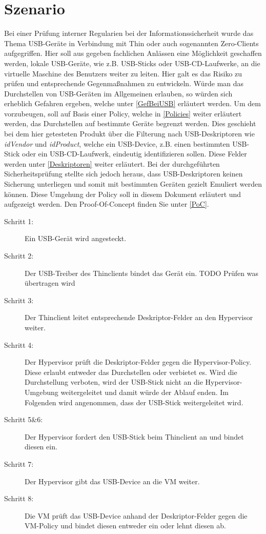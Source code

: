 \chapter{Szenario}
Bei einer Prüfung interner Regularien bei der Informationssicherheit wurde das Thema USB-Geräte in Verbindung mit Thin oder auch sogenannten Zero-Clients aufgegriffen. Hier soll aus gegeben fachlichen Anlässen eine Möglichkeit geschaffen werden, lokale USB-Geräte, wie z.B. USB-Sticks oder USB-CD-Laufwerke, an die virtuelle Maschine des Benutzers weiter zu leiten. Hier galt es das Risiko zu prüfen und entsprechende Gegenmaßnahmen zu entwickeln. 
Würde man das Durchstellen von USB-Geräten im Allgemeinen erlauben, so würden sich erheblich Gefahren ergeben, welche unter \ref{GefBeiUSB} erläutert werden. Um dem vorzubeugen, soll auf Basis einer Policy, welche in \ref{Policies} weiter erläutert werden, das Durchstellen auf bestimmte Geräte begrenzt werden. Dies geschieht bei dem hier getesteten Produkt über die Filterung nach USB-Deskriptoren wie \textit{idVendor} und \textit{idProduct}, welche ein USB-Device, z.B. einen bestimmten USB-Stick oder ein USB-CD-Laufwerk, eindeutig identifizieren sollen. Diese Felder werden unter \ref{Deskriptoren} weiter erläutert.
Bei der durchgeführten Sicherheitsprüfung stellte sich jedoch heraus, dass USB-Deskriptoren keinen Sicherung unterliegen und somit mit bestimmten Geräten gezielt Emuliert werden können. Diese Umgehung der Policy soll in diesem Dokument erläutert und aufgezeigt werden. Den Proof-Of-Concept finden Sie unter \ref{PoC}.



\begin{description}
	\item[Schritt 1: ] Ein USB-Gerät wird angesteckt.
	\item[Schritt 2: ] Der USB-Treiber des Thinclients bindet das Gerät ein. TODO Prüfen was übertragen wird
	\item[Schritt 3: ] Der Thinclient leitet entsprechende Deskriptor-Felder an den Hypervisor weiter.
	\item[Schritt 4: ] Der Hypervisor prüft die Deskriptor-Felder gegen die Hypervisor-Policy. Diese erlaubt entweder das Durchstellen oder verbietet es. Wird die Durchstellung verboten, wird der USB-Stick nicht an die Hypervisor-Umgebung weitergeleitet und damit würde der Ablauf enden. Im Folgenden wird angenommen, dass der USB-Stick weitergeleitet wird.
	\item[Schritt 5\&6: ] Der Hypervisor fordert den USB-Stick beim Thinclient an und bindet diesen ein.
	\item[Schritt 7: ] Der Hypervisor gibt das USB-Device an die VM weiter.
	\item[Schritt 8: ] Die VM prüft das USB-Device anhand der Deskriptor-Felder gegen die VM-Policy und bindet diesen entweder ein oder lehnt diesen ab.
\end{description}